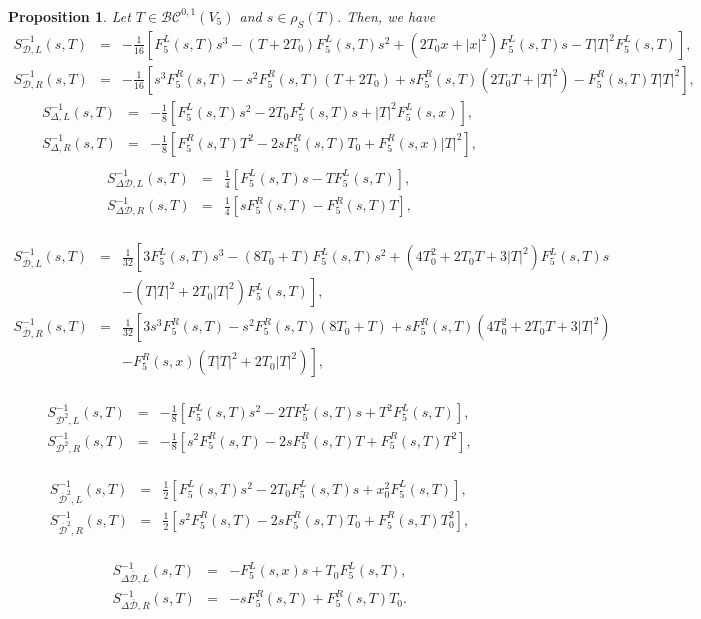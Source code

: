 \documentclass[reqno,11pt]{amsart}
\numberwithin{equation}{section}
\newtheorem{proposition}[theorem]{Proposition}
\theoremstyle{definition}
\begin{document}
\begin{proposition}
\label{Fkernel}
Let $T \in \mathcal{BC}^{0,1}(V_5)$ and $s \in \rho_S(T)$. Then, we have
\begin{eqnarray*}
S^{-1}_{\mathcal D,L}(s,T)&=&-\frac 1{16}\left[F^L_5(s,T)s^3-(T+2T_0)F^L_5(s,T)s^2+(2T_0x+|x|^2)F^L_5(s,T)s-T|T|^2F^L_5(s,T)\right],\\
S^{-1}_{\mathcal D,R}(s,T)&=&-\frac 1{16}\left[s^3F^R_5(s,T)-s^2F^R_5(s,T)(T+2T_0)+sF^R_5(s,T)(2T_0T+|T|^2)-F^R_5(s,T)T|T|^2\right],
\end{eqnarray*}
\begin{eqnarray*}
S^{-1}_{\Delta,L}(s,T)&=&-\frac 1{8}\left[ F^L_5(s,T)s^2-2T_0F^L_5(s,T)s+|T|^2F^L_5(s,x) \right],\\
S^{-1}_{\Delta,R}(s,T)&=&-\frac 1{8}\left[ F^R_5(s,T)T^2-2sF^R_5(s,T)T_0+F^R_5(s,x)|T|^2 \right],\\
\end{eqnarray*}
\begin{eqnarray*}
S^{-1}_{\Delta\mathcal D,L}(s,T)&=&\frac {1}{4}\left[F^{L}_5(s,T)s-TF^L_5(s,T)\right],\\
S^{-1}_{\Delta\mathcal D,R}(s,T)&=&\frac {1}{4}\left[sF^{R}_5(s,T)-F^R_5(s,T)T\right],\\
\end{eqnarray*}

\begin{eqnarray*}
S^{-1}_{\overline{\mathcal D},L}(s,T)&=& \frac 1{32}\left[3F^L_5(s,T)s^3-(8T_0+T)F^L_5(s,T)s^2+(4T_0^2+2T_0T+3|T|^2)F^L_5(s,T)s\right.\\
&&\left.-(T|T|^2+2T_0|T|^2)F^L_5(s,T)\right],\\
S^{-1}_{\overline{\mathcal D},R}(s,T)&=& \frac 1{32}\left[3s^3F^R_5(s,T)-s^2F^R_5(s,T)(8T_0+T)+sF^R_5(s,T)(4T_0^2+2T_0T+3|T|^2)\right.\\
&&\left.-F^R_5(s,x)(T|T|^2+2T_0|T|^2)\right],\\
\end{eqnarray*}

\begin{eqnarray*}
S^{-1}_{\mathcal{D}^2,L}(s,T)&=&-\frac 1{8}\left[F^L_5(s,T)s^2-2T F^L_5(s,T)s+T^2F^L_5(s,T)\right],\\
S^{-1}_{\mathcal{D}^2,R}(s,T)&=&-\frac 1{8}\left[s^2F^R_5(s,T)-2 sF^R_5(s,T)T+F^R_5(s,T)T^2\right],\\
\end{eqnarray*}

\begin{eqnarray*}
S^{-1}_{\mathcal{\overline{D}}^{2},L}(s,T)&=&\frac{1}{2}[F_{5}^{L}(s,T)s^2-2T_0 F_{5}^{L}(s,T)s+ x_0^2 F_{5}^{L}(s,T)],\\
\nonumber
S^{-1}_{\mathcal{\overline{D}}^{2},R}(s,T)&=&\frac{1}{2}[s^2F_{5}^{R}(s,T)-2 sF_{5}^{R}(s,T)T_0+  F_{5}^{R}(s,T)T_0^2],\\
\nonumber
\end{eqnarray*}

\begin{eqnarray*}
S^{-1}_{\Delta\mathcal{\overline{D}},L}(s,T)&=&-F_{5}^L(s,x)s+T_0 F_{5}^L(s,T),\\
\nonumber
S^{-1}_{\Delta\mathcal{\overline{D}},R}(s,T)&=&-sF_{5}^R(s,T)+ F_{5}^R(s,T)T_0.
\end{eqnarray*}
\end{proposition}
\end{document}
